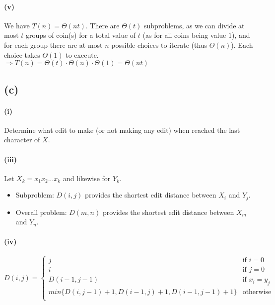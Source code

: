 \documentclass[11pt]{article}
\begin{document}
\paragraph{(v)}

We have $T(n) = \Theta(nt)$. There are $\Theta(t)$ subproblems, as we can divide at most $t$ groups of coin(s) for a total value of $t$ (as for all coins being value $1$), and for each group there are at most $n$ possible choices to iterate (thus $\Theta(n)$). Each choice takes $\Theta(1)$ to execute. \\
$\Longrightarrow T(n) =  \Theta(t) \cdot \Theta(n) \cdot \Theta(1) =  \Theta(nt)$

\subsection{(c)}

\paragraph{(i)} Determine what edit to make (or not making any edit) when reached the last character of $X$.

\paragraph{(iii)}
Let $X_k = x_1x_2...x_k$ and likewise for $Y_k$.

\begin{itemize}
    \item Subproblem: $D(i, j)$ provides the shortest edit distance between $X_i$ and $Y_j$.
    \item Overall problem: $D(m, n)$ provides the shortest edit distance between $X_m$ and $Y_n$.
\end{itemize}

\paragraph{(iv)}

\begin{equation}
    D(i, j) =
    \begin{cases}
        j & \text{if \ } i = 0 \\
        i & \text{if \ } j = 0 \\
        D(i-1, j-1) & \text{if \ } x_i = y_j \\
        min\{D(i, j-1) + 1, D(i-1, j) + 1, D(i-1, j-1) + 1  \} & \text{otherwise}\\
    \end{cases}\nonumber
\end{equation}
\end{document}
